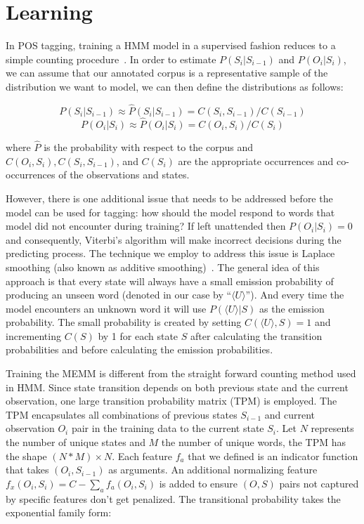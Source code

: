 \section{Learning}
\label{sec:learning}
In POS tagging, training a HMM model in a supervised fashion reduces to a simple counting procedure~\cite{nlpBook}. In order to estimate $P( S_i | S_{i-1} )$ and $P( O_i | S_i )$, we can assume that our annotated corpus is a representative sample of the distribution we want to model, we can then define the distributions as follows:

\vspace{-1em}
\begin{equation}
P( S_i | S_{i-1} ) \approx \hat{P}( S_i | S_{i-1} ) = C( S_i, S_{i-1} )/C( S_{i-1} )
\end{equation}
\vspace{-1em}
\begin{equation}
P( O_i | S_i ) \approx \hat{P}( O_i | S_i ) = C( O_i, S_i )/C( S_i )
\end{equation}

where $\hat{P}$ is the probability with respect to the corpus and $C( O_i, S_i ), C( S_i, S_{i-1} )$, and $C( S_i )$ are the appropriate occurrences and co-occurrences of the observations and states.

However, there is one additional issue that needs to be addressed before the model can be used for tagging: how should the model respond to words that model did not encounter during training? If left unattended then $P( O_i | S_i ) = 0$ and consequently, Viterbi's algorithm will make incorrect decisions during the predicting process. The technique we employ to address this issue is Laplace smoothing (also known as additive smoothing)~\cite{laplaceSmooth}. The general idea of this approach is that every state will always have a small emission probability of producing an unseen word (denoted in our case by ``$\langle U \rangle $''). And every time the model encounters an unknown word it will use $P(\langle U \rangle| S )$ as the emission probability. The small probability is created by setting $C(\langle U \rangle, S ) = 1$ and incrementing $C( S )$ by 1 for each state $S$ after calculating the transition probabilities and before calculating the emission probabilities.

Training the MEMM is different from the straight forward counting method used in HMM. Since state transition depends on both previous state and the current observation, one large transition probability matrix (TPM) is employed. The TPM encapsulates all combinations of previous states $S_{i-1}$ and current observation $O_i$ pair in the training data to the current state $S_i$. Let $N$ represents the number of unique states and $M$ the number of unique words, the TPM has the shape $(N * M) \times N$. Each feature $f_a$ that we defined is an indicator function that takes $(O_i, S_{i-1})$ as arguments. An additional normalizing feature $f_x(O_i, S_i) = C - \sum\limits_{a} f_a(O_i, S_i)$ is added to ensure $(O, S)$ pairs not captured by specific features don't get penalized. The transitional probability takes the exponential family form:

